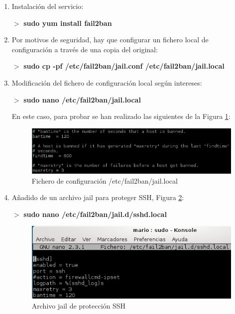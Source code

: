 \begin{enumerate}
	\item Instalación del servicio:
	
	$ > $ \textbf{sudo yum install fail2ban}
	
	\item Por motivos de seguridad, hay que configurar un fichero local de configuración a través de una copia del original:
	
	$ > $ \textbf{sudo cp -pf   /etc/fail2ban/jail.conf   /etc/fail2ban/jail.local }
	
	\item Modificación del fichero de configuración local según intereses:
	
	$ > $ \textbf{sudo nano  /etc/fail2ban/jail.local }
	
	En este caso, para probar se han realizado las siguientes de la Figura \ref{fig:figura25}:
	
	\begin{figure}[H] %
		\centering
		\includegraphics[scale=0.7]{figuras/figura25.png} 
		\caption{Fichero de configuración  /etc/fail2ban/jail.local } 
		\label{fig:figura25}
	\end{figure}

	\item Añadido de un archivo jail para proteger SSH, Figura \ref{fig:figura26}:
	
	$ > $ \textbf{sudo nano /etc/fail2ban/jail.d/sshd.local }
	
	\begin{figure}[H] %
		\centering
		\includegraphics[scale=0.7]{figuras/figura26.png} 
		\caption{Archivo jail de protección SSH} 
		\label{fig:figura26}
	\end{figure}


\end{enumerate}
